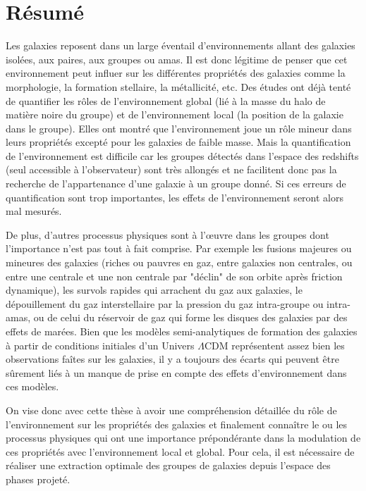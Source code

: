 \chapter*{Résumé}
\label{cha:resume}

Les galaxies reposent dans un large éventail d'environnements allant des
galaxies isolées, aux paires, aux groupes ou amas. Il est donc légitime de
penser que cet environnement peut influer sur les différentes propriétés des
galaxies comme la morphologie, la formation stellaire, la métallicité, etc. Des
études ont déjà tenté de quantifier les rôles de l'environnement global (lié à
la masse du halo de matière noire du groupe) et de l'environnement local (la
position de la galaxie dans le groupe). Elles ont montré que l'environnement
joue un rôle mineur dans leurs propriétés excepté pour les galaxies de faible
masse. Mais la quantification de l'environnement est difficile car les groupes
détectés dans l'espace des redshifts (seul accessible à l'observateur) sont
très allongés et ne facilitent donc pas la recherche de l'appartenance d'une
galaxie à un groupe donné. Si ces erreurs de quantification sont trop
importantes, les effets de l'environnement seront alors mal mesurés.

De plus, d'autres processus physiques sont à l'œuvre dans les groupes dont
l'importance n'est pas tout à fait comprise. Par exemple les fusions majeures
ou mineures des galaxies (riches ou pauvres en gaz, entre galaxies non
centrales, ou entre une centrale et une non centrale par "déclin" de son
orbite après friction dynamique), les survols rapides qui arrachent du gaz aux
galaxies, le dépouillement du gaz interstellaire par la pression du gaz
intra-groupe ou intra-amas, ou de celui du réservoir de gaz qui forme les
disques des galaxies par des effets de marées. Bien que les modèles
semi-analytiques de formation des galaxies à partir de conditions initiales
d'un Univers $\Lambda${CDM} représentent assez bien les observations faîtes sur
les galaxies, il y a toujours des écarts qui peuvent être sûrement liés à un
manque de prise en compte des effets d'environnement dans ces modèles.

On vise donc avec cette thèse à avoir une compréhension détaillée du rôle de
l'environnement sur les propriétés des galaxies et finalement connaître le ou
les processus physiques qui ont une importance prépondérante dans la modulation
de ces propriétés avec l'environnement local et global. Pour cela, il est
nécessaire de réaliser une extraction optimale des groupes de galaxies depuis
l'espace des phases projeté.

